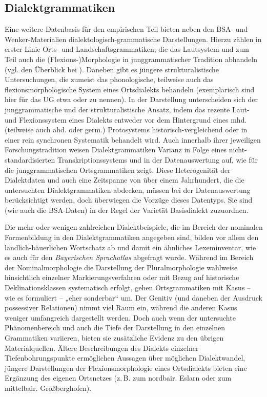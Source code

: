 \subsection{Dialektgrammatiken}\label{sec:6.2.3}\largerpage
\begin{sloppypar}
Eine weitere Datenbasis für den empirischen Teil bieten neben den BSA- und Wenker-Materialien dialektologisch-grammatische Darstellungen. Hierzu zählen in erster Linie Orts- und Landschaftsgrammatiken, die das Lautsystem und zum Teil auch die (Flexions-)Morphologie in junggrammatischer Tradition abhandeln (vgl. den Überblick bei \citealt[80--82]{Murray2010}). Daneben gibt es jüngere strukturalistische Untersuchungen, die zumeist das phonologische, teilweise auch das flexionsmorphologische System eines Ortsdialekts behandeln (exemplarisch sind hier für das UG etwa \citealt{Dozauer1967} oder \citealt{Kufner1961} zu nennen). In der Darstellung unterscheiden sich der junggrammatische und der strukturalistische Ansatz, indem das rezente Laut- und Flexionssystem eines Dialekts entweder vor dem Hintergrund eines mhd. (teilweise auch ahd. oder germ.) Protosystems historisch-vergleichend oder in einer rein synchronen Systematik behandelt wird. Auch innerhalb ihrer jeweiligen Forschungstradition weisen Dialektgrammatiken Varianz in Folge eines nicht-standardisierten Transkriptionssystems und in der Datenauswertung auf, wie \citet[81--82]{Murray2010} für die junggrammatischen Ortsgrammatiken zeigt. Diese Heterogenität der Dialektdaten und auch eine Zeitspanne von über einem Jahrhundert, die die untersuchten Dialektgrammatiken abdecken, müssen bei der Datenauswertung berücksichtigt werden, doch überwiegen die Vorzüge dieses Datentyps. Sie sind (wie auch die BSA-Daten) in der Regel der Varietät Basisdialekt zuzuordnen.
\end{sloppypar}

Die mehr oder wenigen zahlreichen Dialektbeispiele, die im Bereich der nominalen Formenbildung in den Dialektgrammatiken angegeben sind, bilden vor allem den ländlich-bäuerlichen Wortschatz ab und damit ein ähnliches Lexeminventar, wie es auch für den \textit{Bayerischen Sprachatlas} abgefragt wurde. Während im Bereich der Nominalmorphologie die Darstellung der Pluralmorphologie wahlweise hinsichtlich einzelner Markierungsverfahren oder mit Bezug auf historische Deklinationsklassen systematisch erfolgt, gehen Ortsgrammatiken mit Kasus -- wie \citet[40]{Birkenes2014} es formuliert -- „eher sonderbar“ um. Der Genitiv (und daneben der Ausdruck possessiver Relationen) nimmt viel Raum ein, während die anderen Kasus weniger umfangreich dargestellt werden. Doch auch wenn der untersuchte Phänomenbereich und auch die Tiefe der Darstellung in den einzelnen Grammatiken variieren, bieten sie zusätzliche Evidenz zu den übrigen Materialquellen. Ältere Beschreibungen des Dialekts einzelner Tiefenbohrungspunkte ermöglichen Aussagen über möglichen Dialektwandel, jüngere Darstellungen der Flexionsmorphologie eines Ortsdialekts bieten eine Ergänzung des eigenen Ortsnetzes (z.\,B. \citealt{Bachmann2000} zum nordbair. Eslarn oder \citealt{Gladiator1971} zum mittelbair. Großberghofen).

